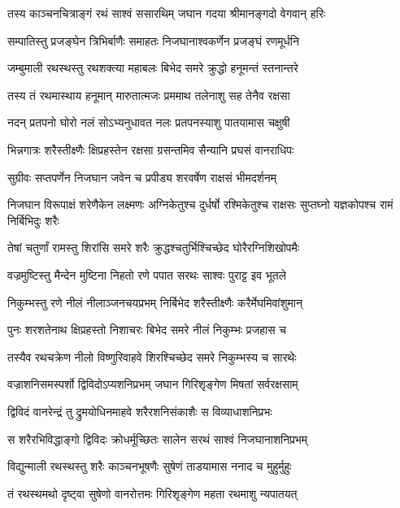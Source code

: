\twolineshloka
{तस्य काञ्चनचित्राङ्गं रथं साश्वं ससारथिम्}
{जघान गदया श्रीमानङ्गदो वेगवान् हरिः} %

\twolineshloka
{सम्पातिस्तु प्रजङ्घेन त्रिभिर्बाणैः समाहतः}
{निजघानाश्वकर्णेन प्रजङ्घं रणमूर्धनि} %

\twolineshloka
{जम्बुमाली रथस्थस्तु रथशक्त्या महाबलः}
{बिभेद समरे क्रुद्धो हनूमन्तं स्तनान्तरे} %

\twolineshloka
{तस्य तं रथमास्थाय हनूमान् मारुतात्मजः}
{प्रममाथ तलेनाशु सह तेनैव रक्षसा} %

\twolineshloka
{नदन् प्रतपनो घोरो नलं सोऽभ्यनुधावत}
{नलः प्रतपनस्याशु पातयामास चक्षुषी} %

\twolineshloka
{भिन्नगात्रः शरैस्तीक्ष्णैः क्षिप्रहस्तेन रक्षसा}
{ग्रसन्तमिव सैन्यानि प्रघसं वानराधिपः} %

\twolineshloka
{सुग्रीवः सप्तपर्णेन निजघान जवेन च}
{प्रपीड्य शरवर्षेण राक्षसं भीमदर्शनम्} %

\threelineshloka
{निजघान विरूपाक्षं शरेणैकेन लक्ष्मणः}
{अग्निकेतुश्च दुर्धर्षो रश्मिकेतुश्च राक्षसः}
{सुप्तघ्नो यज्ञकोपश्च रामं निर्बिभिदुः शरैः} %

\twolineshloka
{तेषां चतुर्णां रामस्तु शिरांसि समरे शरैः}
{क्रुद्धश्चतुर्भिश्चिच्छेद घोरैरग्निशिखोपमैः} %

\twolineshloka
{वज्रमुष्टिस्तु मैन्देन मुष्टिना निहतो रणे}
{पपात सरथः साश्वः पुराट्ट इव भूतले} %

\twolineshloka
{निकुम्भस्तु रणे नीलं नीलाञ्जनचयप्रभम्}
{निर्बिभेद शरैस्तीक्ष्णैः करैर्मेघमिवांशुमान्} %

\twolineshloka
{पुनः शरशतेनाथ क्षिप्रहस्तो निशाचरः}
{बिभेद समरे नीलं निकुम्भः प्रजहास च} %

\twolineshloka
{तस्यैव रथचक्रेण नीलो विष्णुरिवाहवे}
{शिरश्चिच्छेद समरे निकुम्भस्य च सारथेः} %

\twolineshloka
{वज्राशनिसमस्पर्शो द्विविदोऽप्यशनिप्रभम्}
{जघान गिरिशृङ्गेण मिषतां सर्वरक्षसाम्} %

\twolineshloka
{द्विविदं वानरेन्द्रं तु द्रुमयोधिनमाहवे}
{शरैरशनिसंकाशैः स विव्याधाशनिप्रभः} %

\twolineshloka
{स शरैरभिविद्धाङ्गो द्विविदः क्रोधर्मूच्छितः}
{सालेन सरथं साश्वं निजघानाशनिप्रभम्} %

\twolineshloka
{विद्युन्माली रथस्थस्तु शरैः काञ्चनभूषणैः}
{सुषेणं ताडयामास ननाद च मुहुर्मुहुः} %

\twolineshloka
{तं रथस्थमथो दृष्ट्वा सुषेणो वानरोत्तमः}
{गिरिशृङ्गेण महता रथमाशु न्यपातयत्} %

